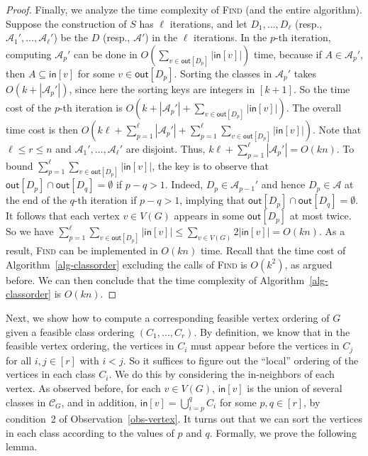 \documentclass[english]{lipics-v2021}
\begin{document}
\begin{proof}
Finally, we analyze the time complexity of \textsc{Find} (and the entire algorithm).
Suppose the construction of $S$ has $\ell$ iterations, and let $D_1,\dots,D_\ell$ (resp., $\mathcal{A}_1',\dots,\mathcal{A}_\ell'$) be the $D$ (resp., $\mathcal{A}'$) in the $\ell$ iterations.
In the $p$-th iteration, computing $\mathcal{A}_p'$ can be done in $O(\sum_{v \in \mathsf{out}[D_p]} |\mathsf{in}[v]|)$ time, because if $A \in \mathcal{A}_p'$, then $A \subseteq \mathsf{in}[v]$ for some $v \in \mathsf{out}[D_p]$.
Sorting the classes in $\mathcal{A}_p'$ takes $O(k+|\mathcal{A}_p'|)$, since here the sorting keys are integers in $[k+1]$.
So the time cost of the $p$-th iteration is $O(k+|\mathcal{A}_p'|+\sum_{v \in \mathsf{out}[D_p]} |\mathsf{in}[v]|)$.
The overall time cost is then $O(k \ell + \sum_{p=1}^\ell |\mathcal{A}_p'| + \sum_{p=1}^\ell \sum_{v \in \mathsf{out}[D_p]} |\mathsf{in}[v]|)$.
Note that $\ell \leq r \leq n$ and $\mathcal{A}_1',\dots,\mathcal{A}_\ell'$ are disjoint.
Thus, $k \ell + \sum_{p=1}^\ell |\mathcal{A}_p'| = O(kn)$.
To bound $\sum_{p=1}^\ell \sum_{v \in \mathsf{out}[D_p]} |\mathsf{in}[v]|$, the key is to observe that $\mathsf{out}[D_p] \cap \mathsf{out}[D_q] = \emptyset$ if $p-q>1$.
Indeed, $D_p \in \mathcal{A}_{p-1}'$ and hence $D_p \in \mathcal{A}$ at the end of the $q$-th iteration if $p-q>1$, implying that $\mathsf{out}[D_p] \cap \mathsf{out}[D_q] = \emptyset$.
It follows that each vertex $v \in V(G)$ appears in some $\mathsf{out}[D_p]$ at most twice.
So we have $\sum_{p=1}^\ell \sum_{v \in \mathsf{out}[D_p]} |\mathsf{in}[v]| \leq \sum_{v \in V(G)} 2|\mathsf{in}[v]| = O(kn)$.
As a result, \textsc{Find} can be implemented in $O(kn)$ time.
Recall that the time cost of Algorithm~\ref{alg-classorder} excluding the calls of \textsc{Find} is $O(k^2)$, as argued before.
We can then conclude that the time complexity of Algorithm~\ref{alg-classorder} is $O(kn)$.
\end{proof}

Next, we show how to compute a corresponding feasible vertex ordering of $G$ given a feasible class ordering $(C_1,\dots,C_r)$.
By definition, we know that in the feasible vertex ordering, the vertices in $C_i$ must appear before the vertices in $C_j$ for all $i,j \in [r]$ with $i < j$.
So it suffices to figure out the ``local'' ordering of the vertices in each class $C_i$.
We do this by considering the in-neighbors of each vertex.
As observed before, for each $v \in V(G)$, $\mathsf{in}[v]$ is the union of several classes in $\mathcal{C}_G$, and in addition, $\mathsf{in}[v] = \bigcup_{i=p}^q C_i$ for some $p,q \in [r]$, by condition~2 of Observation~\ref{obs-vertex}.
It turns out that we can sort the vertices in each class according to the values of $p$ and $q$.
Formally, we prove the following lemma.
\end{document}
